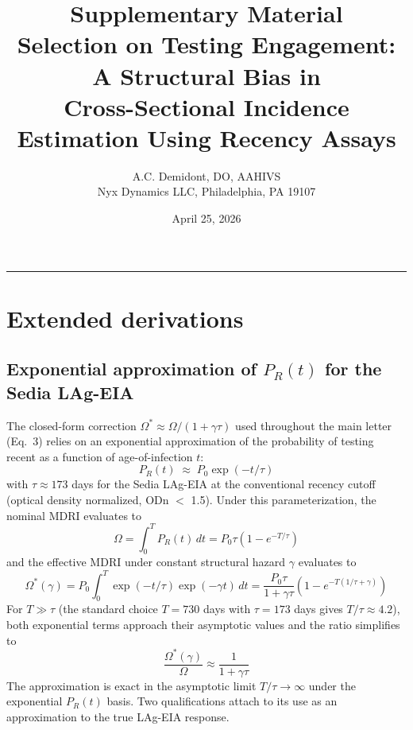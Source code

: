 \documentclass[11pt]{article}
\title{\textbf{Supplementary Material}\\[0.4em]
\large Selection on Testing Engagement: A Structural Bias in\\
Cross-Sectional Incidence Estimation Using Recency Assays}
\author{A.C. Demidont, DO, AAHIVS\\ Nyx Dynamics LLC, Philadelphia, PA 19107}
\date{April 25, 2026}
\begin{document}
\maketitle
\onehalfspacing

\tableofcontents
\vspace{1em}
\hrule
\vspace{1em}
\section{Extended derivations}

\subsection{Exponential approximation of \texorpdfstring{$P_R(t)$}{PR(t)} for the Sedia LAg-EIA}

The closed-form correction $\Omega^* \approx \Omega/(1+\gamma\tau)$ used throughout the main letter (Eq.~3) relies on an exponential approximation of the probability of testing recent as a function of age-of-infection $t$:
\begin{equation}
P_R(t) \;\approx\; P_0 \exp(-t/\tau) \label{eq:PR_exp}
\end{equation}
with $\tau \approx 173$ days for the Sedia LAg-EIA at the conventional recency cutoff (optical density normalized, ODn $<$ 1.5). Under this parameterization, the nominal MDRI evaluates to
\begin{equation}
\Omega = \int_0^T P_R(t)\,dt = P_0 \tau (1 - e^{-T/\tau}) \label{eq:Omega_full}
\end{equation}
and the effective MDRI under constant structural hazard $\gamma$ evaluates to
\begin{equation}
\Omega^*(\gamma) = P_0 \int_0^T \exp(-t/\tau) \exp(-\gamma t)\,dt
= \frac{P_0\tau}{1 + \gamma\tau}\left(1 - e^{-T(1/\tau + \gamma)}\right) \label{eq:Omega_star_full}
\end{equation}
For $T \gg \tau$ (the standard choice $T = 730$ days with $\tau = 173$ days gives $T/\tau \approx 4.2$), both exponential terms approach their asymptotic values and the ratio simplifies to
\begin{equation}
\frac{\Omega^*(\gamma)}{\Omega} \approx \frac{1}{1 + \gamma\tau} \label{eq:Omega_star_closed}
\end{equation}
The approximation is exact in the asymptotic limit $T/\tau \to \infty$ under the exponential $P_R(t)$ basis. Two qualifications attach to its use as an approximation to the true LAg-EIA response.
\end{document}
